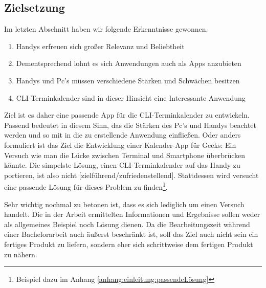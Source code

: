 \subsection{Zielsetzung}\label{section:zielsetzung} \myCheckmark

Im letzten Abschnitt haben wir folgende Erkenntnisse gewonnen.
\begin{enumerate}
	\item Handys erfreuen sich großer Relevanz und Beliebtheit
	\item Dementsprechend lohnt es sich Anwendungen auch als Apps anzubieten
	\item Handys und Pc's müssen verschiedene Stärken und Schwächen besitzen
	\item CLI-Terminkalender sind in dieser Hinsicht eine Interessante Anwendung
\end{enumerate}

\myNewSection
Ziel ist es daher eine passende App für die CLI-Terminkalender zu entwickeln. Passend bedeutet in diesem Sinn, das die Stärken des Pc's und Handys beachtet werden und so mit in die zu erstellende Anwendung einfließen.\newline%
Oder anders formuliert ist das Ziel die \glqq Entwicklung einer Kalender-App für Geeks: Ein Versuch wie man die Lücke zwischen Terminal und Smartphone überbrücken könnte\grqq.\newline%
Die simpelste Lösung, einen CLI-Terminkalender auf das Handy zu portieren, ist also nicht [zielführend/zufriedenstellend]. Stattdessen wird versucht eine passende Lösung für dieses Problem zu finden\footnote{Beispiel dazu im Anhang \ref{anhang:einleitung:passendeLösung}}.

\myNewSection
Sehr wichtig nochmal zu betonen ist, dass es sich lediglich um einen Versuch handelt. Die in der Arbeit ermittelten Informationen und Ergebnisse sollen weder als allgemeines Beispiel noch Lösung dienen.\newline%
Da die Bearbeitungszeit während einer Bachelorarbeit auch äußerst beschränkt ist, soll das Ziel auch nicht sein ein fertiges Produkt zu liefern, sondern eher sich schrittweise dem fertigen Produkt zu nähern.


